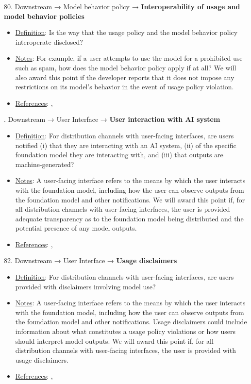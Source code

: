 80. Downstream → Model behavior policy → \textbf{Interoperability of usage and model behavior policies}
\vspace{-\parskip}
\begin{itemize}
	\item
	\underline{Definition}: Is the way that the usage policy and the model behavior policy interoperate disclosed?
	\item
	\underline{Notes}: For example, if a user attempts to use the model for a prohibited use such as spam, how does the model behavior policy apply if at all? We will also award this point if the developer reports that it does not impose any restrictions on its model's behavior in the event of usage policy violation.
	\item
	\underline{References}: \citet{reuter2023im}, \citet{qi2023finetuning}
\end{itemize}


. Downstream → User Interface → \textbf{User interaction with AI system}
\vspace{-\parskip}
\begin{itemize}
	\item
	\underline{Definition}: For distribution channels with user-facing interfaces, are users notified (i) that they are interacting with an AI system, (ii) of the specific foundation model they are interacting with, and (iii) that outputs are machine-generated?
	\item
	\underline{Notes}: A user-facing interface refers to the means by which the user interacts with the foundation model, including how the user can observe outputs from the foundation model and other notifications. We will award this point if, for all distribution channels with user-facing interfaces, the user is provided adequate transparency as to the foundation model being distributed and the potential presence of any model outputs.
	\item
	\underline{References}: \citet{qiaosi2023ux}, \citet{nakao2022responsible}
\end{itemize}


82. Downstream → User Interface → \textbf{Usage disclaimers}
\vspace{-\parskip}
\begin{itemize}
	\item
	\underline{Definition}: For distribution channels with user-facing interfaces, are users provided with disclaimers involving model use?
	\item
	\underline{Notes}: A user-facing interface refers to the means by which the user interacts with the foundation model, including how the user can observe outputs from the foundation model and other notifications. Usage disclaimers could include information about what constitutes a usage policy violations or how users should interpret model outputs. We will award this point if, for all distribution channels with user-facing interfaces, the user is provided with usage disclaimers.
	\item
	\underline{References}: \citet{qiaosi2023ux}, \citet{nakao2022responsible}
\end{itemize}


